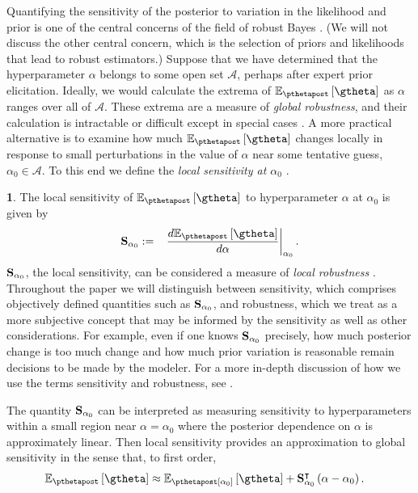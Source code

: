 \documentclass{article}\usepackage[]{graphicx}\usepackage[]{color}
\theoremstyle{definition}
\newtheorem{defn}{\protect\definitionname}
\theoremstyle{plain}
\theoremstyle{plain}
\theoremstyle{plain}
\theoremstyle{definition}
\theoremstyle{plain}
\theoremstyle{plain}
\providecommand{\definitionname}{Definition}
\begin{document}
Quantifying the sensitivity of the posterior to variation in the likelihood and
prior is one of the central concerns of the field of robust Bayes
\citep{berger:2012:robust}. (We will not discuss the other central concern,
which is the selection of priors and likelihoods that lead to robust
estimators.) Suppose that we have determined that the hyperparameter $\alpha$
belongs to some open set $\mathcal{A}$, perhaps after expert prior elicitation.
Ideally, we would calculate the extrema of $\epgtheta$ as $\alpha$ ranges over
all of $\mathcal{A}$. These extrema are a measure of \textit{global robustness},
and their calculation is intractable or difficult except in special cases
\citep[Chapter 15]{moreno:2012:globalrobustness,huber:2011:robust}. A more
practical alternative is to examine how much $\epgtheta$ changes locally in
response to small perturbations in the value of $\alpha$ near some tentative
guess, $\alpha_{0}\in\mathcal{A}$. To this end we define the \textit{local
sensitivity at $\alpha_{0}$} \citep{gustafson:2012:localrobustnessbook}.
\begin{defn} \label{def:exact_sensitivity}
The local sensitivity of $\epgtheta$
to hyperparameter $\alpha$ at $\alpha_{0}$ is given by
\begin{eqnarray}
\psens & := &
    \left.\frac{d\epgtheta}{d\alpha}\right|_{\alpha_{0}}.
    \label{eq:local_robustness}
\end{eqnarray}
$\mathbf{S}_{\alpha_{0}}$, the local sensitivity, can be considered a measure of\emph{
local robustness} \citep{gustafson:2012:localrobustnessbook}. Throughout
the paper we will distinguish between sensitivity, which comprises
objectively defined quantities such as $\mathbf{S}_{\alpha_{0}}$, and robustness,
which we treat as a more subjective concept that may be informed
by the sensitivity as well as other considerations. For example, even
if one knows $\mathbf{S}_{\alpha_{0}}$ precisely, how much posterior change is too
much change and how much prior variation is reasonable remain decisions
to be made by the modeler. For a more in-depth discussion of how we
use the terms sensitivity and robustness, see
.

The quantity $\mathbf{S}_{\alpha_{0}}$ can be interpreted as measuring sensitivity
to hyperparameters within a small region near $\alpha=\alpha_{0}$
where the posterior dependence on $\alpha$ is approximately linear.
Then local sensitivity provides an approximation to global sensitivity
in the sense that, to first order,
\begin{align*}
\epgtheta & \approx\mbe_{\pthetapost[\alpha_0]}\left[\gtheta\right] +
    \psens^{\trans}\left(\alpha-\alpha_{0}\right).
\end{align*}
\end{defn}
\end{document}
